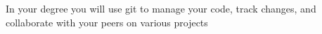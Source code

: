 \documentclass[a4paper,11pt]{article}
\begin{document}
            In your  degree you will use git to manage your code, track changes, and collaborate with your peers on various projects




\end{document}

